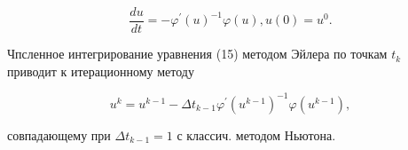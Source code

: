 \documentclass[10pt]{article}
\begin{document}
\[

\frac{d u}{d t}=-\varphi^{\prime}(u)^{-1} \varphi(u), u(0)=u^{0} .

\]



Чпсленное интегрирование уравнения (15) методом Эйлера по точкам $t_{k}$ приводит к итерационному методу



\[

u^{k}=u^{k-1}-\Delta t_{k-1} \varphi^{\prime}\left(u^{k-1}\right)^{-1} \varphi\left(u^{k-1}\right),

\]



совпадающему при $\Delta t_{k-1}=1$ с классич. методом Ньютона.
\end{document}
